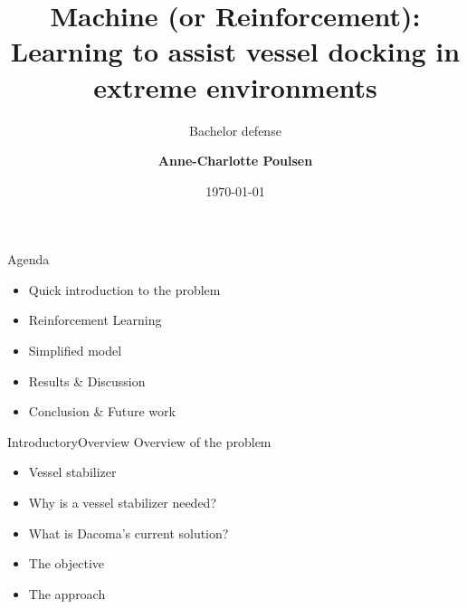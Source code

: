 \documentclass[aspectratio=169,10pt,t]{beamer}
\title{Machine (or Reinforcement): Learning to assist vessel docking in extreme environments}
\subtitle{Bachelor defense}
\date{\today }
\author{
  \textbf{Anne-Charlotte Poulsen}
}
\institute[
  SDU Robotics\\
  The Maersk Mc-Kinney Moller Institute\\
  University of Southern Denmark
] %
{%
  SDU Robotics\\
  The Maersk Mc-Kinney Moller Institute\\
  University of Southern Denmark

}
\begin{document}
{\SDUwavesbg%
\begin{frame} %
  \titlepage
\end{frame}}

\begin{frame}{Agenda}{\vphantom{(y}}
  \begin{itemize}
    \item Quick introduction to the problem
    \item Reinforcement Learning
    \item Simplified model
    \item Results \& Discussion
    \item Conclusion \& Future work
  \end{itemize}
\end{frame}

\begin{frame}{Introductory}{Overview\vphantom{(y}}
\vspace{-0.7em}
Overview of the problem
\begin{itemize}
\item Vessel stabilizer
\item Why is a vessel stabilizer needed?
\item What is Dacoma's current solution?
\item The objective
\item The approach
\end{itemize}
\end{frame}
\end{document}
